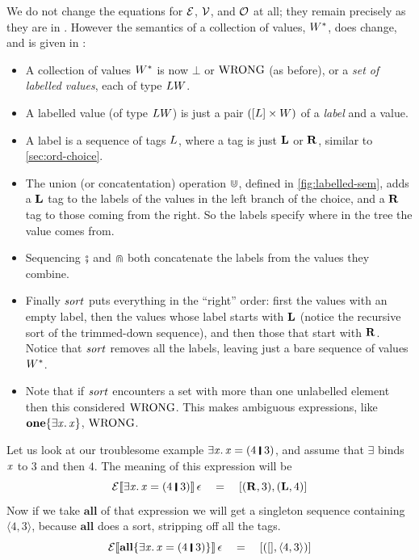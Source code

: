 We do not change the equations for $\mathcal{E}$, $\mathcal{V}$, and $\mathcal{O}$ at all; they remain
precisely as they are in .
However the semantics of a collection of values, $W^{*}$, does change, and is given in :
\begin{itemize}
\item
A collection of values $W^{*}$ is now $\bot$ or $\mathrm{WRONG}$ (as before), or
a \emph{set of labelled values}, each of type $LW$.
\item A labelled value (of type $LW$)
is just a pair $([ L ] \times W)$ of a \emph{label} and a value.
\item A label is a sequence of tags $L$, where a tag is just ${\bf L}$ or ${\bf R}$, similar to \cref{sec:ord-choice}.
\item The union (or concatentation) operation $\Cup$, defined in \cref{fig:labelled-sem},
adds a ${\bf L}$ tag to the labels of the values in the left branch of the choice,
and a ${\bf R}$ tag to those coming from the right.
So the labels specify where in the tree the value comes from.
\item Sequencing $\fatsemi$ and $\Cap$ both concatenate the labels from the values they combine.
\item Finally $\mathit{sort}$ puts everything in the ``right'' order: first the values with
an empty label, then the values whose label starts with ${\bf L}$ (notice the
recursive sort of the trimmed-down sequence), and then those that start with ${\bf R}$.
Notice that $\mathit{sort}$ removes all the labels, leaving just a bare sequence of values $W^{*}$.
\item Note that if $\mathit{sort}$ encounters a set with more than one unlabelled element then this
considered $\mathrm{WRONG}$.  This makes ambiguous expressions, like \ensuremath{\textbf{one}\{\exists\Varid{x}.\,\Varid{x}\}}, $\mathrm{WRONG}$.
\end{itemize}
Let us look at our troublesome example \ensuremath{\exists\Varid{x}.\,\Varid{x}\mathrel{=}(\mathrm{4}\;\rule[-0.1em]{0.15em}{0.75em}\;\mathrm{3})}, and assume that
\ensuremath{\exists{}} binds \ensuremath{\Varid{x}} to \ensuremath{\mathrm{3}} and then \ensuremath{\mathrm{4}}. The meaning of
this expression will be
$$
\semapp{E}{\ensuremath{\exists\Varid{x}.\,\Varid{x}\mathrel{=}(\mathrm{4}\;\rule[-0.1em]{0.15em}{0.75em}\;\mathrm{3})}}{\epsilon} \quad = \quad [ (\lblright,3), (\lblleft,4) ]
$$
Now if we take \ensuremath{\textbf{all}} of that expression we will get a singleton sequence
containing \ensuremath{\langle{}\mathrm{4},\mathrm{3}\rangle}, because \ensuremath{\textbf{all}} does a sort, stripping off all the tags.
$$
\semapp{E}{\ensuremath{\textbf{all}\{\exists\Varid{x}.\,\Varid{x}\mathrel{=}(\mathrm{4}\;\rule[-0.1em]{0.15em}{0.75em}\;\mathrm{3})\}}}{\epsilon} \quad = \quad [ ([], \ensuremath{\langle{}\mathrm{4},\mathrm{3}\rangle}) ]
$$

